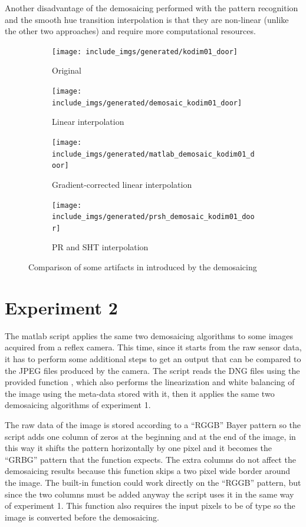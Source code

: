 \documentclass[a4paper,oneside]{article}
\begin{document}
Another disadvantage of the demosaicing performed with the pattern
recognition and the smooth hue transition interpolation is that they
are non-linear (unlike the other two approaches) and require more
computational resources.
\begin{figure}[htbp]
  \centering
  \begin{subfigure}{0.4\textwidth}
    \centering
    \texttt{[image: include\_imgs/generated/kodim01\_door]}
    \caption{Original}
  \end{subfigure}%
  \begin{subfigure}{0.4\textwidth}
    \centering
    \texttt{[image: include\_imgs/generated/demosaic\_kodim01\_door]}
    \caption{Linear interpolation}
  \end{subfigure}
  \begin{subfigure}{0.4\textwidth}
    \centering
    \texttt{[image: include\_imgs/generated/matlab\_demosaic\_kodim01\_door]}
    \caption{Gradient-corrected linear interpolation}
  \end{subfigure}%
  \begin{subfigure}{0.4\textwidth}
    \centering
    \texttt{[image: include\_imgs/generated/prsh\_demosaic\_kodim01\_door]}
    \caption{PR and SHT interpolation}
  \end{subfigure}
  \caption{Comparison of some artifacts in 
    introduced by the demosaicing}
  \label{fig:door}
\end{figure}

\section*{Experiment 2}
The matlab script  applies the same two demosaicing
algorithms to some images acquired from a reflex camera. This time,
since it starts from the raw sensor data, it has to perform some
additional steps to get an output that can be compared to the JPEG
files produced by the camera. The script reads the DNG files using the
provided function , which also performs the
linearization and white balancing of the image using the meta-data
stored with it, then it applies the same two demosaicing algorithms
of experiment 1.

The raw data of the image is stored according to a ``RGGB'' Bayer
pattern so the script adds one column of zeros at the beginning and at
the end of the image, in this way it shifts the pattern horizontally
by one pixel and it becomes the ``GRBG'' pattern that the function
 expects. The extra columns do not affect
the demosaicing results because this function skips a two pixel wide
border around the image.  The built-in  function
could work directly on the ``RGGB'' pattern, but since the two columns
must be added anyway the script uses it in the same way of experiment
1. This function also requires the input pixels to be of type
 so the image is converted before the demosaicing.
\end{document}

